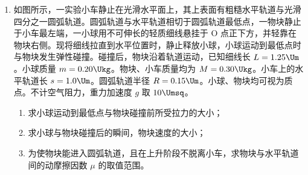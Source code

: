 \documentclass[\gkver]{gaokaozhenti}
\begin{document}
\begin{enumerate}

\item
如图所示，一实验小车静止在光滑水平面上，其上表面有粗糙水平轨道与光滑四分之一圆弧轨道。圆弧轨道与水平轨道相切于圆弧轨道最低点，一物块静止于小车最左端，一小球用不可伸长的轻质细线悬挂于 O 点正下方，并轻靠在物块右侧。现将细线拉直到水平位置时，静止释放小球，小球运动到最低点时与物块发生弹性碰撞。碰撞后，物块沿着轨道运动，已知细线长 $L = 1.25 \Um$。小球质量 $m = 0.20 \Ukg$。物块、小车质量均为 $M = 0.30 \Ukg$。小车上的水平轨道长 $s = 1.0 \Um$。圆弧轨道半径 $R = 0.15 \Um$。小球、物块均可视为质点。不计空气阻力，重力加速度 $g$ 取 $10 \Umsq$。
\begin{enumerate}
	\item
	求小球运动到最低点与物块碰撞前所受拉力的大小；
	\item
	求小球与物块碰撞后的瞬间，物块速度的大小；
	\item
	为使物块能进入圆弧轨道，且在上升阶段不脱离小车，求物块与水平轨道间的动摩擦因数 $\mu$ 的取值范围。
\end{enumerate}

\jdanswer{
\begin{enumerate}
	\item
	$6 \UN$

	\item
	$4 \Ums$


\end{enumerate}}
\end{enumerate}
\end{document}
